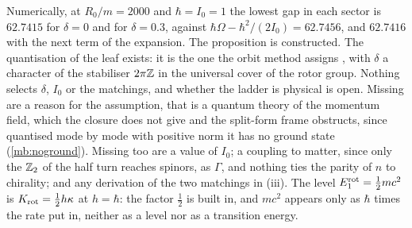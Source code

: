 Numerically, at $R_0/m=2000$ and $\hbar=I_0=1$ the lowest gap in each sector is $62.7415$ for $\delta=0$ and for $\delta=0.3$, against
$\hbar\Omega-\hbar^2/(2I_0)=62.7456$, and $62.7416$ with the next term of the expansion. The proposition is constructed. The quantisation of the
leaf exists: it is the one the orbit method assigns \cite{Kirillov04}, with $\delta$ a character of the stabiliser $2\pi\mathbb{Z}$ in the universal
cover of the rotor group. Nothing selects $\delta$, $I_0$ or the matchings, and whether the ladder is physical is open. Missing are a reason for
the assumption, that is a quantum theory of the momentum field, which the closure does not give and the split-form frame obstructs, since quantised
mode by mode with positive norm it has no ground state (\cref{mb:noground}). Missing too are
a value of $I_0$; a coupling to matter, since only the $\mathbb{Z}_2$ of the half turn reaches spinors, as $\Gamma$, and nothing ties the parity of $n$ to
chirality; and any derivation of the two matchings in (iii). The level $E^{\rm rot}_1=\tfrac12mc^2$ is $K_{\rm rot}=\tfrac12h\kappa$ at $h=\hbar$: the
factor $\tfrac12$ is built in, and $mc^2$ appears only as $\hbar$ times the rate put in, neither as a level nor as a transition energy.
